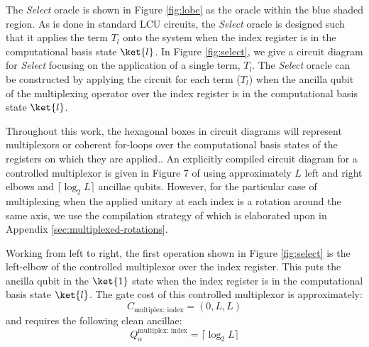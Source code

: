 The \textit{Select} oracle is shown in Figure \ref{fig:lobe} as the oracle within the blue shaded region.
As is done in standard LCU circuits, the \textit{Select} oracle is designed such that it applies the term $T_l$ onto the system when the index register is in the computational basis state $\ket{l}$.
In Figure \ref{fig:select}, we give a circuit diagram for \textit{Select} focusing on the application of a single term, $T_l$.
The \textit{Select} oracle can be constructed by applying the circuit for each term ($T_l$) when the ancilla qubit of the multiplexing operator over the index register is in the computational basis state $\ket{l}$.

Throughout this work, the hexagonal boxes in circuit diagrams will represent multiplexors or coherent for-loops over the computational basis states of the registers on which they are applied..
An explicitly compiled circuit diagram for a controlled multiplexor is given in Figure 7 of \cite{babbush2018encoding} using approximately $L$ left and right elbows and $\lceil \log_2{L} \rceil$ ancillae qubits.
However, for the particular case of multiplexing when the applied unitary at each index is a rotation around the same axis, we use the compilation strategy of \cite{mottonen2004transformation} which is elaborated upon in Appendix \ref{sec:multiplexed-rotations}.

Working from left to right, the first operation shown in Figure \ref{fig:select} is the left-elbow of the controlled multiplexor over the index register.
This puts the ancilla qubit in the $\ket{1}$ state when the index register is in the computational basis state $\ket{l}$.
The gate cost of this controlled multiplexor is approximately:
\begin{equation}
    C_{\text{multiplex: index}} = (0, L, L)
\end{equation}
and requires the following clean ancillae:
\begin{equation}
    Q_{\alpha}^{\text{multiplex: index}} = \lceil \log_2{L} \rceil
\end{equation}

